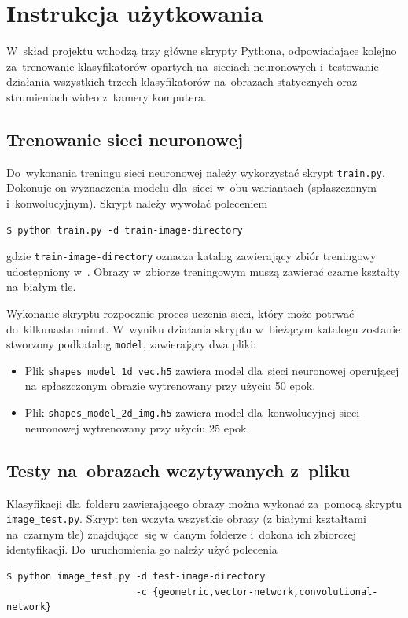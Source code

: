 \documentclass[11pt,a4paper]{article}
\begin{document}
\section{Instrukcja użytkowania}

W~skład projektu wchodzą trzy główne skrypty Pythona, odpowiadające kolejno za~trenowanie klasyfikatorów opartych na~sieciach neuronowych i~testowanie działania wszystkich trzech klasyfikatorów na~obrazach statycznych oraz strumieniach wideo z~kamery komputera. 

\subsection{Trenowanie sieci neuronowej}

Do~wykonania treningu sieci neuronowej należy wykorzystać skrypt \verb+train.py+.
Dokonuje on wyznaczenia modelu dla~sieci w~obu wariantach (spłaszczonym i~konwolucyjnym).
Skrypt należy wywołać poleceniem
\begin{verbatim}
$ python train.py -d train-image-directory
\end{verbatim}
gdzie \verb+train-image-directory+ oznacza katalog zawierający zbiór treningowy udostępniony w~\cite{shapes}.
Obrazy w~zbiorze treningowym muszą zawierać czarne kształty na~białym tle.

Wykonanie skryptu rozpocznie proces uczenia sieci, który może potrwać do~kilkunastu minut.
W~wyniku działania skryptu w~bieżącym katalogu zostanie stworzony podkatalog \verb+model+, zawierający dwa pliki:

\begin{itemize}
    \item Plik \verb+shapes_model_1d_vec.h5+ zawiera model dla~sieci neuronowej operującej na~spłaszczonym obrazie wytrenowany przy użyciu 50 epok.
    \item Plik \verb+shapes_model_2d_img.h5+ zawiera model dla~konwolucyjnej sieci neuronowej wytrenowany przy użyciu 25 epok.
\end{itemize}

\subsection{Testy na~obrazach wczytywanych z~pliku}

Klasyfikacji dla~folderu zawierającego obrazy można wykonać za~pomocą skryptu \verb+image_test.py+.
Skrypt ten wczyta wszystkie obrazy (z białymi kształtami na~czarnym tle) znajdujące~się w~danym folderze i~dokona ich zbiorczej identyfikacji.
Do~uruchomienia go należy użyć polecenia
\begin{verbatim}
$ python image_test.py -d test-image-directory
                       -c {geometric,vector-network,convolutional-network}
\end{verbatim}
\end{document}
